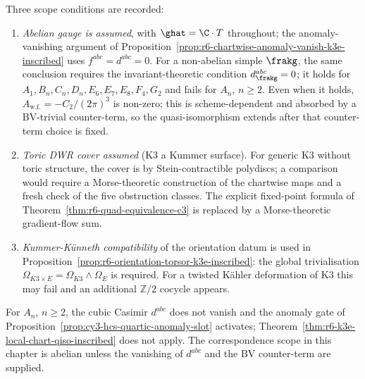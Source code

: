 \begin{remark}
\label{rem:r6-scope-k3e-inscribed}
Three scope conditions are recorded:
\begin{enumerate}
\item \emph{Abelian gauge is assumed}, with $\ghat=\C\cdot T$
throughout; the anomaly-vanishing argument of
Proposition~\ref{prop:r6-chartwise-anomaly-vanish-k3e-inscribed} uses
$f^{abc}=d^{abc}=0$. For a non-abelian simple $\frakg$, the same
conclusion requires the invariant-theoretic condition
$d^{abc}_\frakg=0$; it holds for $A_1, B_n, C_n, D_n, E_6, E_7, E_8,
F_4, G_2$ and fails for $A_n$, $n\geq2$. Even when it holds,
$A_{\mathrm{w.f.}}=-C_2/(2\pi)^3$ is non-zero; this is
scheme-dependent and absorbed by a BV-trivial counter-term, so the
quasi-isomorphism extends after that counter-term choice is fixed.
\item \emph{Toric DWR cover assumed} (K3 a Kummer surface). For
generic K3 without toric structure, the cover is by
Stein-contractible polydiscs; a comparison would require a
Morse-theoretic construction of the chartwise maps and a fresh check of
the five obstruction classes. The explicit
fixed-point formula of
Theorem~\ref{thm:r6-quad-equivalence-c3} is replaced by a
Morse-theoretic gradient-flow sum.
\item \emph{Kummer-K\"unneth compatibility} of the orientation datum
is used in
Proposition~\ref{prop:r6-orientation-torsor-k3e-inscribed}: the
global trivialisation $\Omega_{K3\times E}=\Omega_{K3}\wedge\Omega_E$
is required. For a twisted K\"ahler deformation of K3 this may fail
and an additional $\mathbb Z/2$ cocycle appears.
\end{enumerate}
For $A_n$, $n\geq2$, the cubic Casimir $d^{abc}$ does not vanish and
the anomaly gate of
Proposition~\ref{prop:cy3-hcs-quartic-anomaly-slot} activates;
Theorem~\ref{thm:r6-k3e-local-chart-qiso-inscribed} does not
apply. The correspondence scope in this chapter is abelian unless the
vanishing of $d^{abc}$ and the BV counter-term are supplied.
\end{remark}

